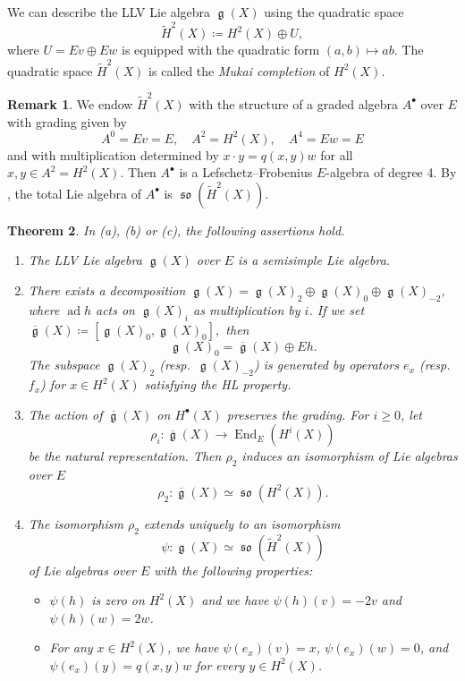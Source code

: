 \documentclass[12pt,reqno]{amsart}
\newtheorem{thm}{Theorem}[section]
\theoremstyle{definition}
\newtheorem{rem}[thm]{Remark}
\newcommand\End{\mathop{\mathrm{End}}\nolimits}
\renewcommand\ge{\mathop{\mathfrak{g}}\nolimits}
\newcommand\so{\mathop{\mathfrak{so}}\nolimits}
\DeclareMathOperator{\ad}{ad}
\numberwithin{equation}{section}
\begin{document}
We can describe the LLV Lie algebra $\ge(X)$ using the quadratic space
\[
\widetilde{H}^2 (X) \coloneqq  H^2 (X) \oplus U,
\]
where $U= E v \oplus Ew$ is equipped with the quadratic form $(a, b) \mapsto ab$.
The quadratic space
$\widetilde{H}^2 (X)$
is called the \textit{Mukai completion} of 
$H^2 (X)$.


\begin{rem}\label{Remark:Mukai completion as Frobenius algebra}
    We endow $\widetilde{H}^2 (X)$
    with the structure of a graded algebra
    $A^\bullet$ over $E$
    with grading given by
    \[
    A^0=Ev=E, \quad A^2=H^2 (X), \quad A^4=Ew=E
    \]
    and with multiplication determined by
    $x \cdot y = q(x, y)w$
    for all $x,y \in A^2=H^2 (X)$.
    Then $A^\bullet$ is a Lefschetz--Frobenius $E$-algebra of degree 4.
    By \cite[Theorem 9.1]{VerbitskyThesis},
    the total Lie algebra of 
    $A^\bullet$
    is $\so (\widetilde{H}^2 (X))$.
\end{rem}




\begin{thm}\label{Theorem:structure of LLV}
\label{defn-thm:llv}
In  (a), (b) or (c), the following assertions hold.
\begin{enumerate}
    \item
    The LLV Lie algebra $\ge(X)$ over $E$ is a semisimple Lie algebra.
    \item 
    There exists a decomposition 
    $
    \ge(X) = \ge(X)_2 \oplus \ge(X)_0 \oplus \ge(X)_{-2},
    $
    where $\ad h$ acts on $\ge(X)_{i}$ as multiplication by $i$.
    If we set $
    \overline{\ge}(X)\coloneqq [\ge(X)_0, \ge(X)_0],
    $
    then
    \[
    \ge(X)_0 = \overline{\ge}(X) \oplus E h.
    \]
    The subspace $\ge(X)_2$ (resp.~$\ge(X)_{-2}$) is generated by operators $e_x$ (resp.~$f_x$) for $x \in H^2(X)$ satisfying the HL property.
    \item
    The action of $\overline{\ge}(X)$ on
    $H^\bullet(X)$ preserves the grading.
    For $i \geq 0$, let
    \[
    \rho_i \colon \overline{\ge}(X) \rightarrow \End_E(H^i (X)) 
    \]
    be the natural representation.
    Then $\rho_{2}$ induces an isomorphism of Lie algebras over $E$
    \[
    \rho_2 \colon \overline{\ge}(X) \simeq \so (H^2 (X)).
    \]
    \item
    The isomorphism
    $
    \rho_2
    $
    extends uniquely to an isomorphism
    \[
    \psi \colon \ge(X) \simeq \so (\widetilde{H}^2 (X))
    \]
    of Lie algebras over $E$ with the following properties:
    \begin{itemize}
        \item $\psi(h)$ is zero on $H^2 (X)$ and we have $\psi(h)(v)=-2v$ and $\psi(h)(w)=2w$.
        \item For any $x \in H^2 (X)$,
        we have $\psi(e_x)(v)=x$, $\psi(e_x)(w)=0$, and $\psi(e_x)(y)=q(x, y)w$ for every $y \in H^2 (X)$.
    \end{itemize}
\end{enumerate}
\end{thm}
\end{document}
